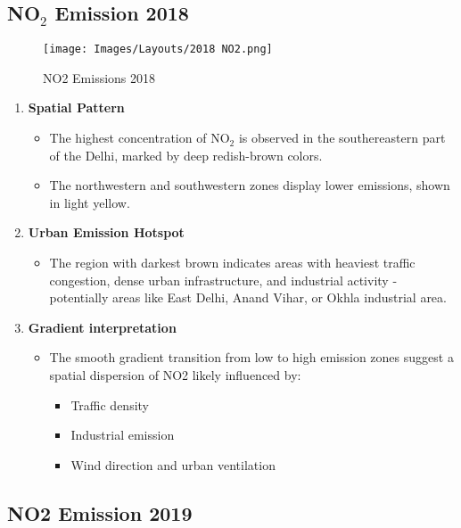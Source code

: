 \documentclass[12pt]{report}
\begin{document}
\subsection{NO$_2$ Emission 2018}
\begin{figure}[H]
    \centering
    \texttt{[image: Images/Layouts/2018 NO2.png]}
    \caption{NO2 Emissions 2018}
\end{figure}
\begin{enumerate}
    \item \textbf{Spatial Pattern}
    \begin{itemize}
        \item The highest concentration of NO$_2$ is observed in the southereastern part of the Delhi, marked by deep redish-brown colors.
        \item The northwestern and southwestern zones display lower emissions, shown in light yellow.
    \end{itemize}
    \item \textbf{Urban Emission Hotspot}
    \begin{itemize}
        \item The region with darkest brown indicates areas with heaviest traffic congestion, dense urban infrastructure, and industrial activity - potentially areas like East Delhi, Anand Vihar, or Okhla industrial area.
    \end{itemize}
    \item \textbf{Gradient interpretation}
    \begin{itemize}
        \item The smooth gradient transition from low to high emission zones suggest a spatial dispersion of NO2 likely influenced by:
        \begin{itemize}
            \item Traffic density
            \item Industrial emission
            \item Wind direction and urban ventilation
        \end{itemize}
    \end{itemize}
\end{enumerate}
\subsection{NO2 Emission 2019}
\end{document}

